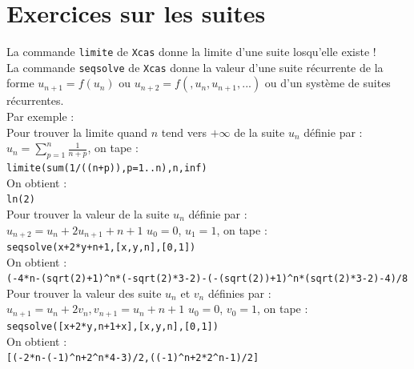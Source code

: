 \documentclass[a4paper,11pt]{book}
\begin{document}
\chapter{Exercices sur les suites}
La commande {\tt limite} de {\tt Xcas} donne la limite d'une suite losqu'elle existe !\\ 
La commande {\tt seqsolve} de {\tt Xcas} donne la valeur d'une suite 
r\'ecurrente de la forme $u_{n+1}=f(u_n)$ ou $u_{n+2}=f(,u_n,u_{n+1},...)$ ou 
d'un syst\`eme de suites r\'ecurrentes.\\
Par exemple :\\
Pour trouver la limite quand $n$ tend vers $+\infty$ de la suite $u_n$ 
d\'efinie par :\\
$u_n=\sum_{p=1}^n\frac{1}{n+p}$, on tape :\\
{\tt limite(sum(1/((n+p)),p=1..n),n,inf)}\\
On obtient :\\
{\tt ln(2)}\\
Pour trouver la valeur de la suite $u_n$ d\'efinie par :\\
$u_{n+2}=u_n+2u_{n+1}+n+1$ $u_0=0$, $u_1=1$, on tape :\\
{\tt seqsolve(x+2*y+n+1,[x,y,n],[0,1])}\\
On obtient :\\
{\tt (-4*n-(sqrt(2)+1)\verb|^|n*(-sqrt(2)*3-2)-(-(sqrt(2))+1)\verb|^|n*(sqrt(2)*3-2)-4)/8}\\
Pour trouver la valeur des suite  $u_n$ et $v_n$ d\'efinies par :\\
$u_{n+1}=u_n+2v_n, v_{n+1}=u_n+n+1$ $u_0=0$, $v_0=1$, on tape :\\
{\tt seqsolve([x+2*y,n+1+x],[x,y,n],[0,1])}\\
On obtient :\\
{\tt [(-2*n-(-1)\verb|^|n+2\verb|^|n*4-3)/2,((-1)\verb|^|n+2*2\verb|^|n-1)/2]}\\
\end{document}

